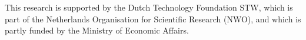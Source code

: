 
This research is supported by the Dutch Technology Foundation STW, which is part
of the Netherlands Organisation for Scientific Research (NWO), and which is
partly funded by the Ministry of Economic Affairs.
